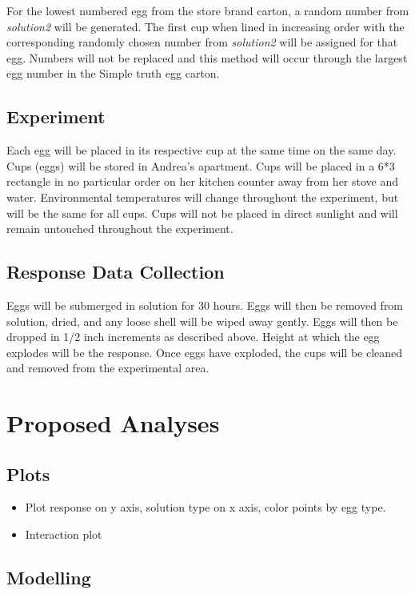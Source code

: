 \documentclass{article}\usepackage[]{graphicx}\usepackage[]{color}
\begin{document}
For the lowest numbered egg from the store brand carton, a random number from {\it solution2} will be generated. The first cup when lined in increasing order with the corresponding randomly chosen number from {\it solution2} will be assigned for that egg. Numbers will not be replaced and  this method will occur through the largest egg number in the Simple truth egg carton.

\subsection{Experiment}

Each egg will be placed in its respective cup at the same time on the same day. Cups (eggs) will be stored in Andrea's apartment. Cups will be placed in a 6*3 rectangle in no particular order on her kitchen counter away from her stove and water. Environmental temperatures will change throughout the experiment, but will be the same for all cups. Cups will not be placed in direct sunlight and will remain untouched throughout the experiment.

\subsection{Response Data Collection}
Eggs will be submerged in solution for 30 hours. Eggs will then be removed from solution, dried, and any loose shell will be wiped away gently. Eggs will then be dropped in 1/2 inch increments as described above. Height at which the egg explodes will be the response. Once eggs have exploded, the cups will be cleaned and removed from the experimental area.

\section{Proposed Analyses}

\subsection{Plots}

\begin{itemize}

\item Plot response on y axis, solution type on x axis, color points by egg type.

\item Interaction plot
\end{itemize}

\subsection{Modelling}
\end{document}
